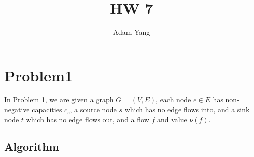 \documentclass[openany]{article}
\begin{document}
\title{HW 7}
\author{Adam Yang}
\maketitle




\section*{Problem1}

In Problem 1, we are given a graph $G=(V,E)$, each node $e\in E$ has non-negative capacities $c_e$, a source node $s$ which has no edge flows into, and a sink node $t$ which has no edge flows out, and a flow $f$ and value $\nu(f)$.

\subsection*{Algorithm}
\end{document}
